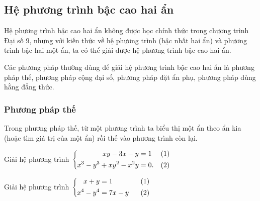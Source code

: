 \subsection{Hệ phương trình bậc cao hai ẩn}

Hệ phương trình bậc cao hai ẩn không được học chính thức trong chương trình Đại số $9$, nhưng với kiến thức về hệ phương trình (bậc nhất hai ẩn) và phương trình bậc hai một ẩn, ta có thể giải được hệ phương trình bậc cao hai ẩn.

Các phương pháp thường dùng để giải hệ phương trình bậc cao hai ẩn là phương pháp thế, phương pháp cộng đại số, phương pháp đặt ẩn phụ, phương pháp dùng hằng đẳng thức.
\subsubsection{Phương pháp thế}

Trong phương pháp thế, từ một phương trình ta biểu thị một ẩn theo ẩn kia (hoặc tìm giá trị của một ẩn) rồi thế vào phương trình còn lại.
\begin{vd}
Giải hệ phương trình $\left\{\begin{aligned}xy-3x-y&=1&& (1)\\ x^3-y^3+xy^2-x^2y&=0.&& (2)\end{aligned}\right.$
\end{vd}
\begin{vd}
Giải hệ phương trình $\heva{x+y&=1 \ \ &(1) \\ x^4 - y^4 &=7x-y \ \ &(2)}$
\end{vd}
